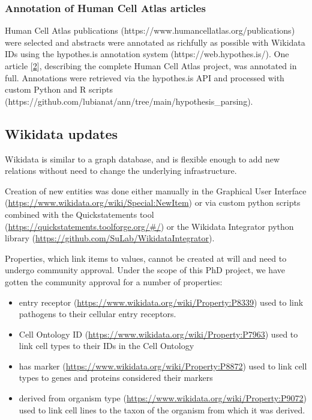 \hypertarget{annotation-of-human-cell-atlas-articles}{%
\subsubsection{Annotation of Human Cell Atlas articles}\label{annotation-of-human-cell-atlas-articles}}

Human Cell Atlas publications (https://www.humancellatlas.org/publications) were selected and abstracts were annotated as richfully as possible with Wikidata IDs using the hypothes.is annotation system (https://web.hypothes.is/). One article {[}\protect\hyperlink{ref-1GmbExweg}{2}{]}, describing the complete Human Cell Atlas project, was annotated in full. Annotations were retrieved via the hypothes.is API and processed with custom Python and R scripts (https://github.com/lubianat/ann/tree/main/hypothesis\_parsing).

\hypertarget{wikidata-updates}{%
\subsection{Wikidata updates}\label{wikidata-updates}}

Wikidata is similar to a graph database, and is flexible enough to add new relations without need to change the underlying infrastructure.

Creation of new entities was done either manually in the Graphical User Interface (\url{https://www.wikidata.org/wiki/Special:NewItem}) or via custom python scripts combined with the Quickstatements tool (\url{https://quickstatements.toolforge.org/\#/}) or the Wikidata Integrator python library (\url{https://github.com/SuLab/WikidataIntegrator}).

Properties, which link items to values, cannot be created at will and need to undergo community approval. Under the scope of this PhD project, we have gotten the community approval for a number of properties:

\begin{itemize}
\tightlist
\item
  entry receptor (\url{https://www.wikidata.org/wiki/Property:P8339}) used to link pathogens to their cellular entry receptors.
\item
  Cell Ontology ID (\url{https://www.wikidata.org/wiki/Property:P7963}) used to link cell types to their IDs in the Cell Ontology
\item
  has marker (\url{https://www.wikidata.org/wiki/Property:P8872}) used to link cell types to genes and proteins considered their markers
\item
  derived from organism type (\url{https://www.wikidata.org/wiki/Property:P9072}) used to link cell lines to the taxon of the organism from which it was derived.
\end{itemize}

